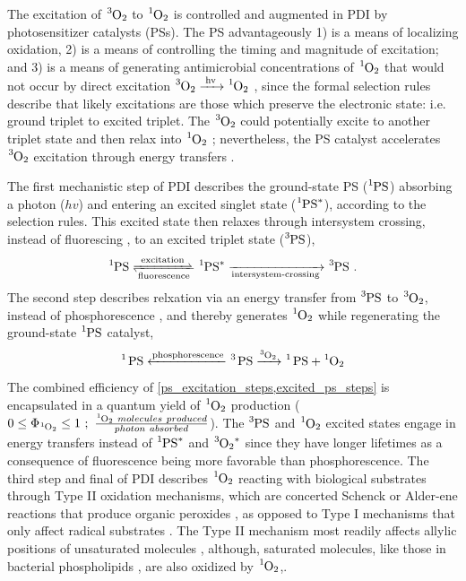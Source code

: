 The excitation of $\ce{^3O2}$ to $\ce{^1O2}$ is controlled and augmented in PDI by photosensitizer catalysts (PSs). The PS advantageously 1) is a means of localizing oxidation, 2) is a means of controlling the timing and magnitude of excitation; and 3) is a means of generating antimicrobial concentrations of $\ce{^1O2}$ that would not occur by direct excitation $\ce{^3O2 ->[{hv}] ^1O2}$ \cite{Krasnovsky2012PhotochemicalEnvironment}, since the formal selection rules \cite{Bowen1936ForbiddenLines} describe that likely excitations are those which preserve the electronic state: i.e. ground triplet to excited triplet. The $\ce{^3O2}$ could potentially excite to another triplet state and then relax into $\ce{^1O2}$ \cite{Long2003SelectionOxygen}; nevertheless, the PS catalyst accelerates $\ce{^3O2}$ excitation through energy transfers \cite{You2018ChemicalOxygen,Schalk2008Near-infraredTetratolyl-porphyrins,Jockusch2008SingletExcitation}.

The first mechanistic step of PDI describes the ground-state PS ($\ce{^1PS}$) absorbing a photon ($hv$) and entering an excited singlet state ($\ce{^1PS^*}$), according to the selection rules. This excited state then relaxes through intersystem crossing, instead of fluorescing \cite{Kessel1982DeterminantsSpectra}, to an excited triplet state ($\ce{^3PS}$),
\begin{equation} \label{ps_excitation_steps}
    \ce{^1PS <=>[{excitation}][{fluorescence}] ^1PS^* ->[][{intersystem-crossing}] ^3PS}~.
\end{equation}
The second step describes relxation via an energy transfer from $\ce{^3PS}$ to $\ce{^3O2}$, instead of phosphorescence \cite{Mcrae1958Enhancement6}, and thereby generates $\ce{^1O2}$ while regenerating the ground-state $\ce{^1PS}$ catalyst,
\begin{equation} \label{excited_ps_steps}
    \ce{^1 PS <-[{phosphorescence}] ^3 PS ->[^3O2] ^1 PS + ^1O2}
\end{equation}
The combined efficiency of \cref{ps_excitation_steps,excited_ps_steps} is encapsulated in a quantum yield of $\ce{^1O2}$ production \cite{Bakalova2004QuantumPhotosensitizers} ($0\le \Phi_{\ce{^1O2}}\le 1 ~;~ \frac{\ce{^1O2} ~molecules ~produced}{photon ~absorbed}$). The $\ce{^3PS}$ and $\ce{^1O2}$ excited states engage in energy transfers instead of $\ce{^1PS^*}$ and $\ce{^3O2^*}$ since they have longer lifetimes as a consequence of fluorescence being more favorable than phosphorescence. The third step and final of PDI describes $\ce{^1O2}$ reacting with biological substrates through Type II oxidation mechanisms, which are concerted Schenck \cite{Prein1996TheApplications} or Alder-ene \cite{Fernandez-torquemada2012DispersionPlants} reactions that produce organic peroxides \cite{Foote1965ChemistrySelectivity}, as opposed to Type I mechanisms \cite{Bolland1949KineticsOxidation,Farmer1943TheRubber,Grynova2011RevisingAutooxidation} that only affect radical substrates \cite{Litwinienko1999DifferentialEsters}. The Type II mechanism most readily affects allylic positions of unsaturated molecules \cite{Ellison1996ThermochemistryIons,Sehon1950TheRadical}, although, saturated molecules, like those in bacterial phospholipids \cite{ODonnell1985NumericalStaphylococci}, are also oxidized by $\ce{^1O2}$,. 

